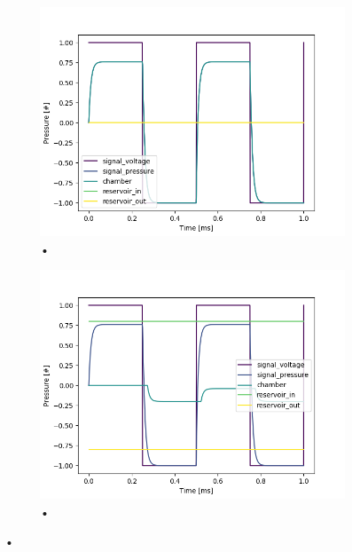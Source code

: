 \documentclass[fontsize=12pt, a4paper]{scrartcl}
\begin{document}
\begin{figure}[H]
    \centering
    \begin{subfigure}[H]{0.48\textwidth}
        \includegraphics[width=\textwidth, valign=t]{bilder/backpressure/backpressure_free.png}
        \caption{•}
    \end{subfigure}
    \begin{subfigure}[H]{0.48\textwidth}
        \includegraphics[width=\textwidth, valign=t]{bilder/backpressure/backpressure_example.png}
        \caption{•}
    \end{subfigure}
    \caption{•}
\end{figure}
\end{document}
